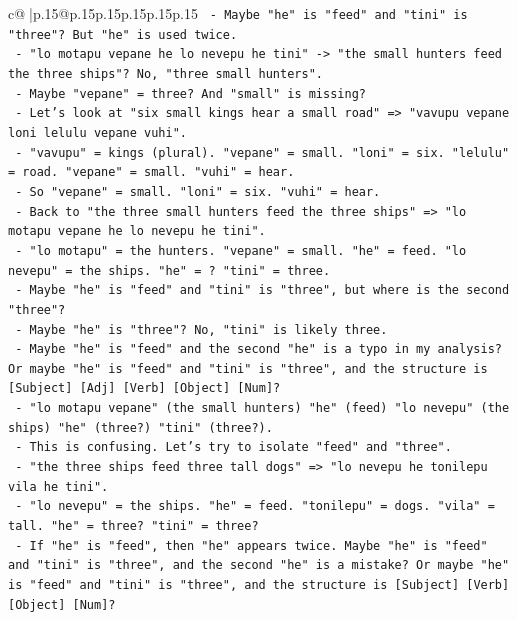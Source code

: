 \documentclass{article}
\begin{document}
{\begin{supertabular}{c@{$\;$}|p{.15\linewidth}@{}p{.15\linewidth}p{.15\linewidth}p{.15\linewidth}p{.15\linewidth}p{.15\linewidth}}
{{{\texttt{         {-} Maybe "he" is "feed" and "tini" is "three"? But "he" is used twice.} \\
\texttt{         {-} "lo motapu vepane he lo nevepu he tini" {-}> "the small hunters feed the three ships"? No, "three small hunters".} \\
\texttt{         {-} Maybe "vepane" = three? And "small" is missing?} \\
\texttt{         {-} Let's look at "six small kings hear a small road" => "vavupu vepane loni lelulu vepane vuhi".} \\
\texttt{           {-} "vavupu" = kings (plural). "vepane" = small. "loni" = six. "lelulu" = road. "vepane" = small. "vuhi" = hear.} \\
\texttt{           {-} So "vepane" = small. "loni" = six. "vuhi" = hear.} \\
\texttt{         {-} Back to "the three small hunters feed the three ships" => "lo motapu vepane he lo nevepu he tini".} \\
\texttt{           {-} "lo motapu" = the hunters. "vepane" = small. "he" = feed. "lo nevepu" = the ships. "he" = ? "tini" = three.} \\
\texttt{           {-} Maybe "he" is "feed" and "tini" is "three", but where is the second "three"?} \\
\texttt{           {-} Maybe "he" is "three"? No, "tini" is likely three.} \\
\texttt{           {-} Maybe "he" is "feed" and the second "he" is a typo in my analysis? Or maybe "he" is "feed" and "tini" is "three", and the structure is {[}Subject{]} {[}Adj{]} {[}Verb{]} {[}Object{]} {[}Num{]}?} \\
\texttt{           {-} "lo motapu vepane" (the small hunters) "he" (feed) "lo nevepu" (the ships) "he" (three?) "tini" (three?).} \\
\texttt{           {-} This is confusing. Let's try to isolate "feed" and "three".} \\
\texttt{           {-} "the three ships feed three tall dogs" => "lo nevepu he tonilepu vila he tini".} \\
\texttt{             {-} "lo nevepu" = the ships. "he" = feed. "tonilepu" = dogs. "vila" = tall. "he" = three? "tini" = three?} \\
\texttt{             {-} If "he" is "feed", then "he" appears twice. Maybe "he" is "feed" and "tini" is "three", and the second "he" is a mistake? Or maybe "he" is "feed" and "tini" is "three", and the structure is {[}Subject{]} {[}Verb{]} {[}Object{]} {[}Num{]}?} \\
}}}
\end{supertabular}}
\end{document}
